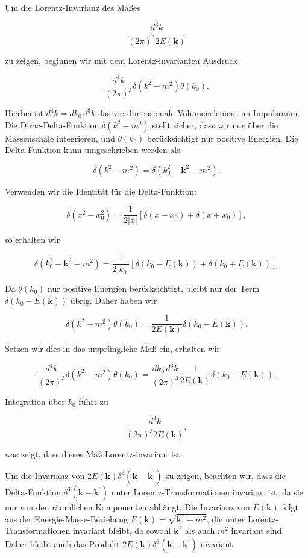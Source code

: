 Um die Lorentz-Invarianz des Maßes 

\[
\frac{d^3 k}{(2 \pi)^3 2 E(\mathbf{k})}
\]

zu zeigen, beginnen wir mit dem Lorentz-invarianten Ausdruck 

\[
\frac{d^4 k}{(2 \pi)^3} \delta\left(k^2 - m^2\right) \theta\left(k_0\right).
\]

Hierbei ist $d^4 k = dk_0 \, d^3 k$ das vierdimensionale Volumenelement im Impulsraum. Die Dirac-Delta-Funktion $\delta\left(k^2 - m^2\right)$ stellt sicher, dass wir nur über die Massenschale integrieren, und $\theta\left(k_0\right)$ berücksichtigt nur positive Energien. Die Delta-Funktion kann umgeschrieben werden als 

\[
\delta\left(k^2 - m^2\right) = \delta\left(k_0^2 - \mathbf{k}^2 - m^2\right).
\]

Verwenden wir die Identität für die Delta-Funktion:

\[
\delta\left(x^2 - x_0^2\right) = \frac{1}{2|x|}\left[\delta\left(x - x_0\right) + \delta\left(x + x_0\right)\right],
\]

so erhalten wir

\[
\delta\left(k_0^2 - \mathbf{k}^2 - m^2\right) = \frac{1}{2|k_0|} \left[\delta\left(k_0 - E(\mathbf{k})\right) + \delta\left(k_0 + E(\mathbf{k})\right)\right].
\]

Da $\theta(k_0)$ nur positive Energien berücksichtigt, bleibt nur der Term $\delta\left(k_0 - E(\mathbf{k})\right)$ übrig. Daher haben wir

\[
\delta\left(k^2 - m^2\right) \theta\left(k_0\right) = \frac{1}{2E(\mathbf{k})} \delta\left(k_0 - E(\mathbf{k})\right).
\]

Setzen wir dies in das ursprüngliche Maß ein, erhalten wir

\[
\frac{d^4 k}{(2 \pi)^3} \delta\left(k^2 - m^2\right) \theta\left(k_0\right) = \frac{dk_0 \, d^3 k}{(2 \pi)^3} \frac{1}{2E(\mathbf{k})} \delta\left(k_0 - E(\mathbf{k})\right).
\]

Integration über $k_0$ führt zu

\[
\frac{d^3 k}{(2 \pi)^3 2E(\mathbf{k})},
\]

was zeigt, dass dieses Maß Lorentz-invariant ist.

Um die Invarianz von $2 E(\mathbf{k}) \delta^3\left(\mathbf{k} - \mathbf{k}^{\prime}\right)$ zu zeigen, beachten wir, dass die Delta-Funktion $\delta^3\left(\mathbf{k} - \mathbf{k}^{\prime}\right)$ unter Lorentz-Transformationen invariant ist, da sie nur von den räumlichen Komponenten abhängt. Die Invarianz von $E(\mathbf{k})$ folgt aus der Energie-Masse-Beziehung $E(\mathbf{k}) = \sqrt{\mathbf{k}^2 + m^2}$, die unter Lorentz-Transformationen invariant bleibt, da sowohl $\mathbf{k}^2$ als auch $m^2$ invariant sind. Daher bleibt auch das Produkt $2 E(\mathbf{k}) \delta^3\left(\mathbf{k} - \mathbf{k}^{\prime}\right)$ invariant.

